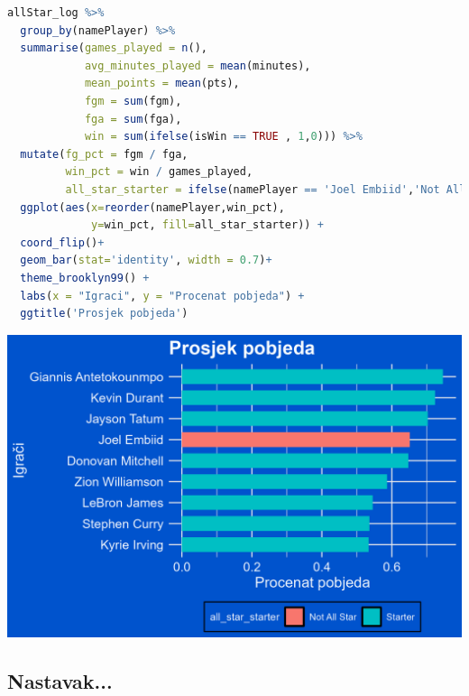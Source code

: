 \documentclass[letterpaper,11pt,leqno]{article}
\begin{document}
\begin{lstlisting}[language=R]
allStar_log %>% 
  group_by(namePlayer) %>% 
  summarise(games_played = n(),
            avg_minutes_played = mean(minutes),
            mean_points = mean(pts),
            fgm = sum(fgm),
            fga = sum(fga),
            win = sum(ifelse(isWin == TRUE , 1,0))) %>% 
  mutate(fg_pct = fgm / fga,
         win_pct = win / games_played,
         all_star_starter = ifelse(namePlayer == 'Joel Embiid','Not All Star' , 'Starter')) %>% 
  ggplot(aes(x=reorder(namePlayer,win_pct),
             y=win_pct, fill=all_star_starter)) + 
  coord_flip()+
  geom_bar(stat='identity', width = 0.7)+  
  theme_brooklyn99() + 
  labs(x = "Igraci", y = "Procenat pobjeda") + 
  ggtitle('Prosjek pobjeda')
\end{lstlisting}

\begin{center}
    \includegraphics[scale=0.9]{ProcenatPobjeda.png}
\end{center}

\subsection{Nastavak...} 
\end{document}
